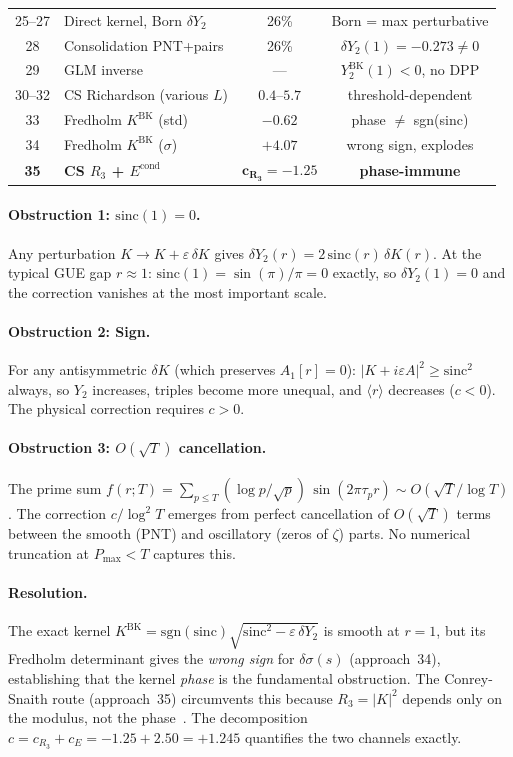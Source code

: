 \documentclass[10pt]{article}
\begin{document}
\begin{table}[h]
\begin{tabular}{clcc}
25--27 & Direct kernel, Born $\delta Y_2$ & 26\% & Born = max perturbative \\
28 & Consolidation PNT+pairs & 26\% & $\delta Y_2(1) = -0.273 \neq 0$ \\
29 & GLM inverse & --- & $Y_2^{\mathrm{BK}}(1) < 0$, no DPP \\
30--32 & CS Richardson (various $L$) & $0.4$--$5.7$ & threshold-dependent \\
33 & Fredholm $K^{\mathrm{BK}}$ (std) & $-0.62$ & phase $\neq$ sgn(sinc) \\
34 & Fredholm $K^{\mathrm{BK}}$ ($\sigma$) & $+4.07$ & wrong sign, explodes \\
\textbf{35} & \textbf{CS $R_3$ + $E^{\mathrm{cond}}$} & $\mathbf{c_{R_3} = -1.25}$ & \textbf{phase-immune} \\
\bottomrule
\end{tabular}
\end{table}

\paragraph{Obstruction 1: $\mathrm{sinc}(1) = 0$.}
Any perturbation $K \to K + \varepsilon\,\delta K$ gives
$\delta Y_2(r) = 2\,\mathrm{sinc}(r)\,\delta K(r)$.
At the typical GUE gap $r \approx 1$: $\mathrm{sinc}(1) = \sin(\pi)/\pi = 0$
exactly, so $\delta Y_2(1) = 0$ and the correction vanishes at the most
important scale.

\paragraph{Obstruction 2: Sign.}
For any antisymmetric $\delta K$ (which preserves $A_1[r] = 0$):
$|K + i\varepsilon A|^2 \geq \mathrm{sinc}^2$ always, so $Y_2$ increases,
triples become more unequal, and $\langle r\rangle$ decreases ($c < 0$).
The physical correction requires $c > 0$.

\paragraph{Obstruction 3: $O(\sqrt{T})$ cancellation.}
The prime sum $f(r; T) = \sum_{p \leq T} (\log p / \sqrt{p})\,\sin(2\pi\tau_p r)
\sim O(\sqrt{T}/\log T)$. The correction $c/\log^2 T$ emerges from perfect
cancellation of $O(\sqrt{T})$ terms between the smooth (PNT) and oscillatory
(zeros of $\zeta$) parts. No numerical truncation at $P_{\max} < T$ captures this.

\paragraph{Resolution.}
The exact kernel $K^{\mathrm{BK}} = \mathrm{sgn}(\mathrm{sinc})\sqrt{\mathrm{sinc}^2 - \varepsilon\,\delta Y_2}$
is smooth at $r = 1$, but its Fredholm determinant gives the \emph{wrong sign}
for $\delta\sigma(s)$ (approach~34), establishing that the kernel \emph{phase}
is the fundamental obstruction. The Conrey-Snaith route (approach~35) circumvents
this because $R_3 = |K|^2$ depends only on the modulus, not the phase~\cite{alarcon2026b}.
The decomposition $c = c_{R_3} + c_E = -1.25 + 2.50 = +1.245$ quantifies the
two channels exactly.
\end{document}
